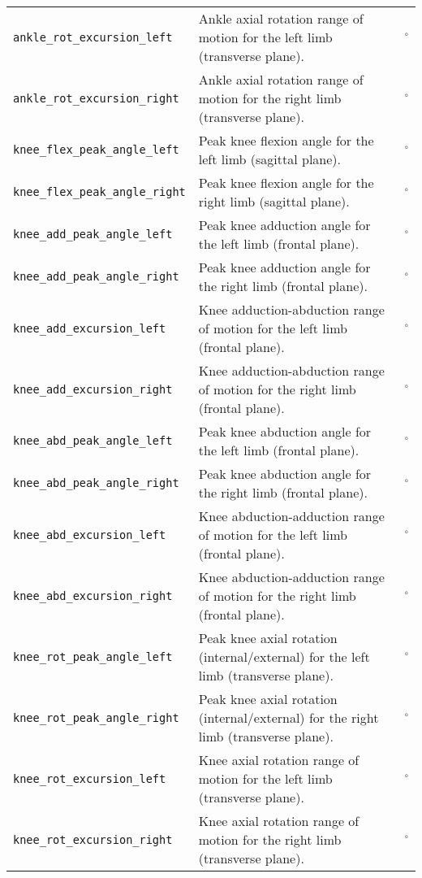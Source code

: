 {\begin{longtable}{@{}p{} p{} p{}@{}}
    \texttt{ankle\_rot\_excursion\_left} & Ankle axial rotation range of motion for the left limb (transverse plane). & $^\circ$ \\
    \texttt{ankle\_rot\_excursion\_right} & Ankle axial rotation range of motion for the right limb (transverse plane). & $^\circ$ \\
    \texttt{knee\_flex\_peak\_angle\_left} & Peak knee flexion angle for the left limb (sagittal plane). & $^\circ$ \\
    \texttt{knee\_flex\_peak\_angle\_right} & Peak knee flexion angle for the right limb (sagittal plane). & $^\circ$ \\
    \texttt{knee\_add\_peak\_angle\_left} & Peak knee adduction angle for the left limb (frontal plane). & $^\circ$ \\
    \texttt{knee\_add\_peak\_angle\_right} & Peak knee adduction angle for the right limb (frontal plane). & $^\circ$ \\
    \texttt{knee\_add\_excursion\_left} & Knee adduction-abduction range of motion for the left limb (frontal plane). & $^\circ$ \\
    \texttt{knee\_add\_excursion\_right} & Knee adduction-abduction range of motion for the right limb (frontal plane). & $^\circ$ \\
    \texttt{knee\_abd\_peak\_angle\_left} & Peak knee abduction angle for the left limb (frontal plane). & $^\circ$ \\
    \texttt{knee\_abd\_peak\_angle\_right} & Peak knee abduction angle for the right limb (frontal plane). & $^\circ$ \\
    \texttt{knee\_abd\_excursion\_left} & Knee abduction-adduction range of motion for the left limb (frontal plane). & $^\circ$ \\
    \texttt{knee\_abd\_excursion\_right} & Knee abduction-adduction range of motion for the right limb (frontal plane). & $^\circ$ \\
    \texttt{knee\_rot\_peak\_angle\_left} & Peak knee axial rotation (internal/external) for the left limb (transverse plane). & $^\circ$ \\
    \texttt{knee\_rot\_peak\_angle\_right} & Peak knee axial rotation (internal/external) for the right limb (transverse plane). & $^\circ$ \\
    \texttt{knee\_rot\_excursion\_left} & Knee axial rotation range of motion for the left limb (transverse plane). & $^\circ$ \\
    \texttt{knee\_rot\_excursion\_right} & Knee axial rotation range of motion for the right limb (transverse plane). & $^\circ$ \\

\end{longtable}}
